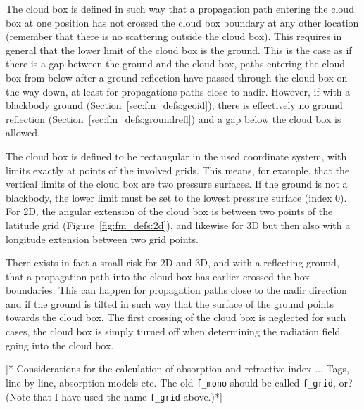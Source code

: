 The cloud box is defined in such way that a propagation path entering
the cloud box at one position has not crossed the cloud box boundary
at any other location (remember that there is no scattering outside
the cloud box). This requires in general that the lower limit of the
cloud box is the ground. This is the case as if there is a gap between
the ground and the cloud box, paths entering the cloud box from below
after a ground reflection have passed through the cloud box on the way
down, at least for propagations paths close to nadir. However, if with
a blackbody ground (Section~\ref{sec:fm_defs:geoid}), there is
effectively no ground reflection
(Section~\ref{sec:fm_defs:groundrefl}) and a gap below the cloud box
is allowed. 

The cloud box is defined to be rectangular in the used coordinate
system, with limits exactly at points of the involved grids. This
means, for example, that the vertical limits of the cloud box are two
pressure surfaces. If the ground is not a blackbody, the lower limit
must be set to the lowest pressure surface (index 0). For 2D, the
angular extension of the cloud box is between two points of the
latitude grid (Figure~\ref{fig:fm_defs:2d}), and likewise for 3D but
then also with a longitude extension between two grid points.

There exists in fact a small risk for 2D and 3D, and with a reflecting
ground, that a propagation path into the cloud box has earlier crossed
the box boundaries. This can happen for propagation paths close to the
nadir direction and if the ground is tilted in such way that the
surface of the ground points towards the cloud box. The first crossing
of the cloud box is neglected for such cases, the cloud box is simply
turned off when determining the radiation field going into the cloud
box.


\label{sec:fm_defs:absorption}

[* Considerations for the calculation of absorption and refractive
index ...  Tags, line-by-line, absorption models etc. The old \verb|f_mono|
should be called \verb|f_grid|, or? (Note that I have used the name
\verb|f_grid| above.)*]



\label{sec:fm_defs:sensor1}

